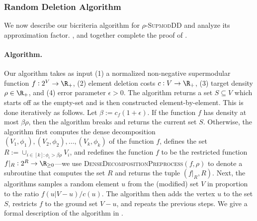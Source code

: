 \documentclass{article}
\newcommand{\supmoddensitydeletionset}{\textsc{SupmodDD}\xspace}
\begin{document}
\subsubsection{Random Deletion Algorithm}\label{sec:bicriteria-random-deletion:algorithm}
We now describe our bicriteria algorithm for $\rho$-\supmoddensitydeletionset and analyze its approximation factor. ,  and 
together complete the proof of .

\paragraph{Algorithm.} Our algorithm takes as input (1) a normalized non-negative supermodular function $f:2^V\rightarrow\R_+$, (2) element deletion costs $c:V\rightarrow\R_+$, (3) target density $\rho \in \R_+$, and (4) error parameter $\epsilon > 0$. The algorithm returns a set $S \subseteq V$ which starts off as the empty-set and is then constructed element-by-element. This is done iteratively as follows. Let $\beta:=c_f (1+\epsilon)$. If the function $f$ has density at most $\beta\rho$, then the algorithm breaks and returns the current set $S$. Otherwise, the algorithm first computes the dense decomposition $(V_1, \phi_1), (V_2, \phi_2), \ldots, (V_k, \phi_k)$ of  the function $f$, defines the set $R := \cup_{i \in [k] : \phi_i > \beta\rho}V_i$, and redefines the function $f$ to be the restricted function $f|_R:2^R \rightarrow\R_{\geq 0}$---we use \textsc{DenseDecompositionPreprocess}$(f, \rho)$ to denote a subroutine that computes the set $R$ and returns the tuple $(f|_{R}, R)$. Next, the algorithms samples a random element $u$ from the (modified) set $V$ in proportion to the ratio $f(u|V-u)/c(u)$. The algorithm then adds the vertex $u$ to the set $S$, restricts $f$ to the ground set $V - u$, and repeats the previous steps. We give a formal description of the algorithm in .
\end{document}
